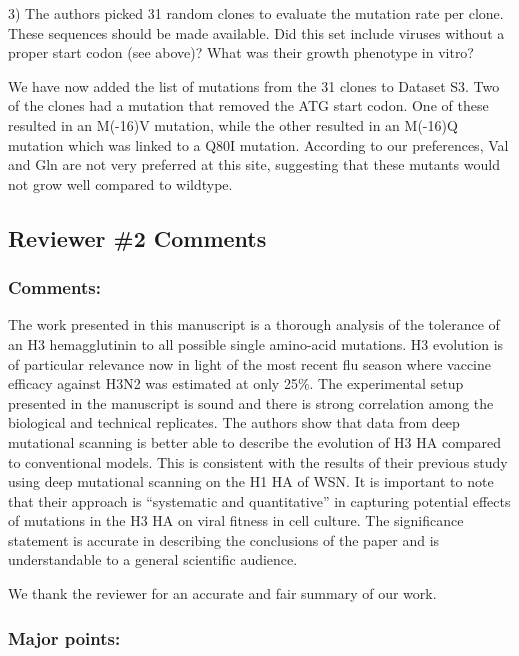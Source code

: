 \documentclass[11pt, oneside]{article}   	%
\newcommand{\response}[1]{{\color{black}#1}}
\begin{document}
3) The authors picked 31 random clones to evaluate the mutation rate per clone. These sequences should be made available. Did this set include viruses without a proper start codon (see above)? What was their growth phenotype in vitro? 

\response{We have now added the list of mutations from the 31 clones to Dataset S3.
Two of the clones had a mutation that removed the ATG start codon.
One of these resulted in an M(-16)V mutation, while the other resulted in an M(-16)Q mutation which was linked to a Q80I mutation.
According to our preferences, Val and Gln are not very preferred at this site, suggesting that these mutants would not grow well compared to wildtype.
}

\subsection*{Reviewer \#2 Comments} 

\subsubsection*{Comments:} 
The work presented in this manuscript is a thorough analysis of the tolerance of an H3 hemagglutinin to all possible single amino-acid mutations. H3 evolution is of particular relevance now in light of the most recent flu season where vaccine efficacy against H3N2 was estimated at only 25\%. The experimental setup presented in the manuscript is sound and there is strong correlation among the biological and technical replicates. The authors show that data from deep mutational scanning is better able to describe the evolution of H3 HA compared to conventional models. This is consistent with the results of their previous study using deep mutational scanning on the H1 HA of WSN. It is important to note that their approach is ``systematic and quantitative'' in capturing potential effects of mutations in the H3 HA on viral fitness in cell culture. The significance statement is accurate in describing the conclusions of the paper and is understandable to a general scientific audience. 

\response{We thank the reviewer for an accurate and fair summary of our work.}

\subsubsection*{Major points:} 
\end{document}
